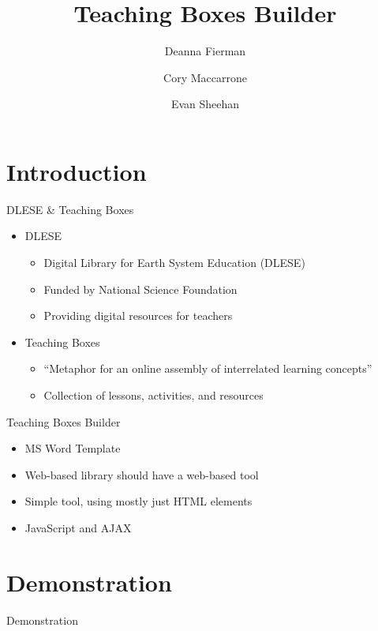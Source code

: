 \documentclass[style=horatio,mode=present,paper=screen]{powerdot}
\title{Teaching Boxes Builder}
\author{
	Deanna Fierman
	\and
	Cory Maccarrone
	\and
	Evan Sheehan
}
\begin{document}
\maketitle

\section[slide=false]{Introduction}
\begin{slide}{DLESE \& Teaching Boxes}
\begin{itemize}[type=1]
\item<1> DLESE
	\begin{itemize}
	\item<1> Digital Library for Earth System Education (DLESE)
	\item<1> Funded by National Science Foundation
	\item<1> Providing digital resources for teachers
	\end{itemize}
\pause
\item<2> Teaching Boxes
	\begin{itemize}
	\item<2> ``Metaphor for an online assembly of interrelated learning concepts''
	\item<2> Collection of lessons, activities, and resources
	\end{itemize}
\end{itemize}
\end{slide}

\begin{slide}{Teaching Boxes Builder}
\begin{itemize}[type=1]
\item<1> MS Word Template
\pause
\item<2> Web-based library should have a web-based tool
\pause
\item<3> Simple tool, using mostly just HTML elements
\pause
\item<4> JavaScript and AJAX
\end{itemize}
\end{slide}

\section[slide=false]{Demonstration}
\begin{slide}[toc=,bm=]{Demonstration}
\end{slide}
\end{document}
